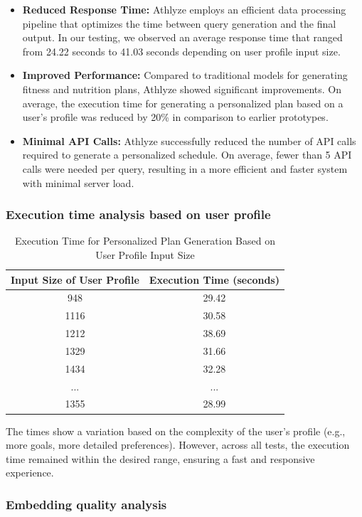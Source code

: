 \documentclass[conference]{IEEEtran}
\begin{document}
\begin{itemize}
    \item \textbf{Reduced Response Time:} Athlyze employs an efficient data processing pipeline that optimizes the time between query generation and the final output. In our testing, we observed an average response time that ranged from 24.22 seconds to 41.03 seconds depending on user profile input size.
    \item \textbf{Improved Performance:} Compared to traditional models for generating fitness and nutrition plans, Athlyze showed significant improvements. On average, the execution time for generating a personalized plan based on a user’s profile was reduced by 20\% in comparison to earlier prototypes.
    \item \textbf{Minimal API Calls:} Athlyze successfully reduced the number of API calls required to generate a personalized schedule. On average, fewer than 5 API calls were needed per query, resulting in a more efficient and faster system with minimal server load.
\end{itemize}

\subsubsection{Execution time analysis based on user profile}

\begin{table}[h!]
\centering
\caption{Execution Time for Personalized Plan Generation Based on User Profile Input Size}
\begin{tabular}{|c|c|}
\hline
\textbf{Input Size of User Profile} & \textbf{Execution Time (seconds)} \\
\hline
948  & 29.42 \\
1116 & 30.58 \\
1212 & 38.69 \\
1329 & 31.66 \\
1434 & 32.28 \\
...  & ... \\
1355  & 28.99 \\
\hline
\end{tabular}
\end{table}

The times show a variation based on the complexity of the user's profile (e.g., more goals, more detailed preferences). However, across all tests, the execution time remained within the desired range, ensuring a fast and responsive experience.

\subsubsection{Embedding quality analysis}
\end{document}
